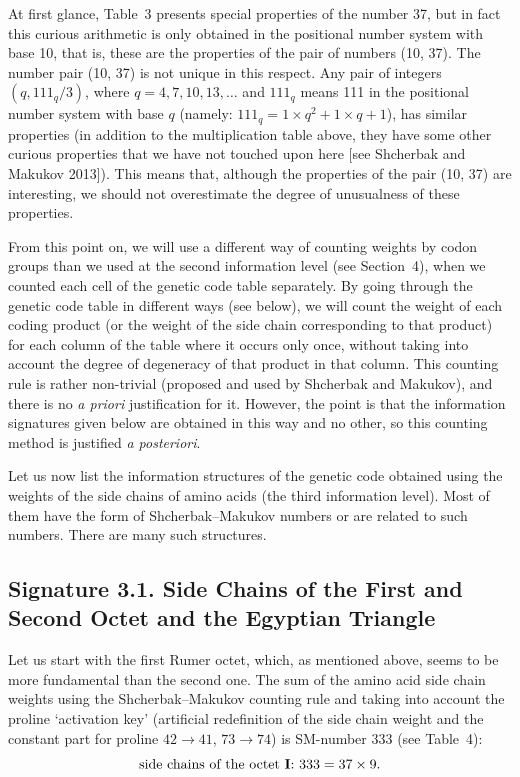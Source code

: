 \documentclass[12pt]{article}
\begin{document}
At first glance, Table~3 presents special properties of the number 37, but in fact this curious arithmetic is only obtained in the positional number system with base 10, that is, these are the properties of the pair of numbers (10, 37). The number pair (10, 37) is not unique in this respect. Any pair of integers $(q, 111_q / 3)$, where $q = 4, 7, 10, 13, \ldots$ and $111_q$ means 111 in the positional number system with base $q$ (namely: $111_q = 1 \times q^2 + 1 \times q + 1$), has similar properties (in addition to the multiplication table above, they have some other curious properties that we have not touched upon here [see Shcherbak and Makukov 2013]). This means that, although the properties of the pair (10, 37) are interesting, we should not overestimate the degree of unusualness of these properties.

From this point on, we will use a different way of counting weights by codon groups than we used at the second information level (see Section~4), when we counted each cell of the genetic code table separately. By going through the genetic code table in different ways (see below), we will count the weight of each coding product (or the weight of the side chain corresponding to that product) for each column of the table where it occurs only once, without taking into account the degree of degeneracy of that product in that column. This counting rule is rather non-trivial (proposed and used by Shcherbak and Makukov), and there is no \textit{a priori} justification for it. However, the point is that the information signatures given below are obtained in this way and no other, so this counting method is justified \textit{a posteriori}.

Let us now list the information structures of the genetic code obtained using the weights of the side chains of amino acids (the third information level). Most of them have the form of Shcherbak--Makukov numbers or are related to such numbers. There are many such structures.

\subsection*{Signature 3.1. Side Chains of the First and Second Octet and the Egyptian Triangle}

Let us start with the first Rumer octet, which, as mentioned above, seems to be more fundamental than the second one. The sum of the amino acid side chain weights using the Shcherbak--Makukov counting rule and taking into account the proline `activation key' (artificial redefinition of the side chain weight and the constant part for proline $42 \to 41$, $73 \to 74$) is SM-number 333 (see Table~4):
\begin{equation}
\text{side chains of the octet \textbf{I}: } 333 = 37 \times 9.
\end{equation}
\end{document}

